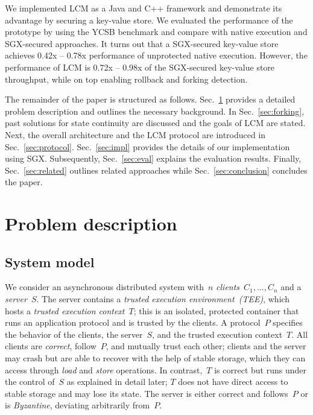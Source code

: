 \documentclass[11pt]{article}
\theoremstyle{plain-boldhead}
\theoremstyle{definition-boldhead}
\newcommand{\op}[1]{\textsl{#1}}
\newcommand{\pp}{LCM\xspace}
\begin{document}
We implemented \pp as a Java and C++ framework and demonstrate its advantage by
securing a key-value store.  We evaluated the performance of the prototype by
using the YCSB benchmark and compare with native execution and SGX-secured approaches.
% 
It turns out that a {SGX}-secured key-value store achieves 0.42x -- 0.78x performance of
unprotected native execution.  However, the performance of \pp is 0.72x -- 0.98x of the SGX-secured key-value store throughput, while on top enabling rollback and forking
detection.

The remainder of the paper is structured as follows.
Sec.~\ref{sec:model} provides a detailed problem description
and outlines the necessary background.  In Sec.~\ref{sec:forking},
past solutions for state continuity are discussed and the goals of
\pp are stated.  
Next, the overall architecture and the \pp protocol are introduced
in Sec.~\ref{sec:protocol}.
Sec.~\ref{sec:impl} provides the details of our implementation using SGX.
Subsequently, Sec.~\ref{sec:eval} explains the evaluation results.
Finally, Sec.~\ref{sec:related} outlines related approaches while Sec.~\ref{sec:conclusion} concludes the paper. 


\section{Problem description}\label{sec:model}

\subsection{System model}

We consider an asynchronous distributed system with~$n$
\emph{clients}~$C_1,...,C_n$ and a \emph{server}~$S$.  The server contains
a \emph{trusted execution environment~(TEE)}, which hosts a \emph{trusted
  execution context}~$T$; this is an isolated, protected container that
runs an application protocol and is trusted by the clients.
% 
A protocol~$P$ specifies the behavior of the clients, the server~$S$, and
the trusted execution context~$T$.  All clients are \emph{correct},
follow~$P$, and mutually trust each other; clients and the server may crash
but are able to recover with the help of stable storage, which they can
access through \op{load} and \op{store} operations.
% 
In contrast,~$T$ is correct but runs under the control of~$S$ as explained
in detail later; $T$ does not have direct access to stable storage and may
lose its state.
% 
The server is either correct and follows~$P$ or is \emph{Byzantine},
deviating arbitrarily from~$P$.  
\end{document}
